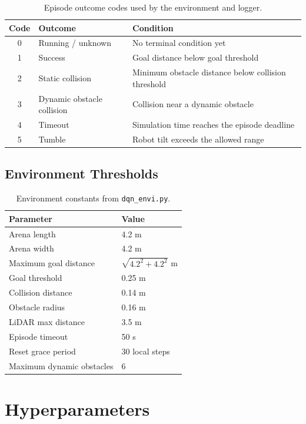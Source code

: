 \documentclass[11pt,a4paper]{article}
\begin{document}
\begin{table}[h]
\centering
\begin{tabular}{cll}
\toprule
\textbf{Code} & \textbf{Outcome} & \textbf{Condition} \\
\midrule
0 & Running / unknown & No terminal condition yet \\
1 & Success & Goal distance below goal threshold \\
2 & Static collision & Minimum obstacle distance below collision threshold \\
3 & Dynamic obstacle collision & Collision near a dynamic obstacle \\
4 & Timeout & Simulation time reaches the episode deadline \\
5 & Tumble & Robot tilt exceeds the allowed range \\
\bottomrule
\end{tabular}
\caption{Episode outcome codes used by the environment and logger.}
\end{table}

\subsection{Environment Thresholds}

\begin{table}[h]
\centering
\begin{tabular}{ll}
\toprule
\textbf{Parameter} & \textbf{Value} \\
\midrule
Arena length & 4.2 m \\
Arena width & 4.2 m \\
Maximum goal distance & $\sqrt{4.2^2 + 4.2^2}$ m \\
Goal threshold & 0.25 m \\
Collision distance & 0.14 m \\
Obstacle radius & 0.16 m \\
LiDAR max distance & 3.5 m \\
Episode timeout & 50 s \\
Reset grace period & 30 local steps \\
Maximum dynamic obstacles & 6 \\
\bottomrule
\end{tabular}
\caption{Environment constants from \texttt{dqn\_envi.py}.}
\end{table}

\section{Hyperparameters}
\end{document}
